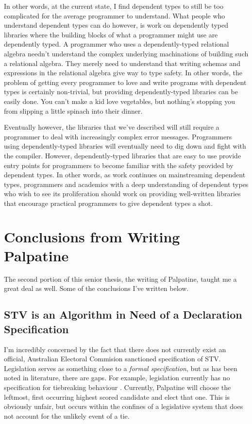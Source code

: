 In other words, at the current state, I find dependent types to still be too
complicated for the average programmer to understand. What people who understand
dependent types can do however, is work on dependently typed libraries where the
building blocks of what a programmer might use are dependently typed. A
programmer who uses a dependently-typed relational algebra needn't understand
the complex underlying machinations of building such a relational algebra. They
merely need to understand that writing schemas and expressions in the relational
algebra give way to type safety. In other words, the problem of getting every
programmer to love and write programs with dependent types is certainly
non-trivial, but providing dependently-typed libraries can be easily done. You
can't make a kid love vegetables, but nothing's stopping you from slipping a
little spinach into their dinner. 

Eventually however, the libraries that we've described will still require a
programmer to deal with increasingly complex error messages. Programmers using
dependently-typed libraries will eventually need to dig down and fight with the
compiler. However, dependently-typed libraries that are easy to use provide
entry points for programmers to become familiar with the safety provided by
dependent types. In other words, as work continues on mainstreaming dependent
types, programmers and academics with a deep understanding of dependent types
who wish to see its proliferation should work on providing well-written
libraries that encourage practical programmers to give dependent types a shot.

\section{Conclusions from Writing Palpatine}

The second portion of this senior thesis, the writing of Palpatine,
taught me a great deal as well. Some of the conclusions I've written below. 

\subsection{STV is an Algorithm in Need of a Declaration Specification}

I'm incredibly concerned by the fact that there does not currently exist an
official, Australian Electoral Commision sanctioned specification of STV.
Legislation serves as something close to a \textit{formal specification}, but as
has been noted in literature, there are gaps. For example, legislation currently
has no specification for tiebreaking behaviour \cite{stv_haskell}. Currently,
Palpatine will choose the leftmost, first occurring highest scored
candidate and elect that one. This is obviously unfair, but occurs within the
confines of a legislative system that does not account for the unlikely event of
a tie. 


